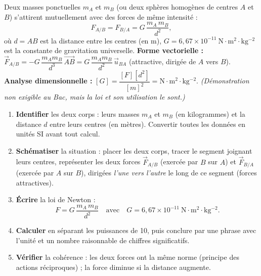 \documentclass[11pt]{article}
\begin{document}
\begin{propriete}
Deux masses ponctuelles $m_A$ et $m_B$ (ou deux sphères homogènes de centres $A$ et $B$) s'attirent mutuellement avec des forces de même intensité :
\[ F_{A/B} = F_{B/A} = G\,\dfrac{m_A\,m_B}{d^2}, \]
où $d = AB$ est la distance entre les centres (en \si{\metre}), $G = 6,67\times 10^{-11}\ \mathrm{N\cdot m^2\cdot kg^{-2}}$ est la constante de gravitation universelle.
\textbf{Forme vectorielle :} $\vec{F}_{A/B} = -G\,\dfrac{m_A m_B}{d^3}\,\vec{AB} = G\,\dfrac{m_A m_B}{d^2}\,\vec{u}_{BA}$ (attractive, dirigée de $A$ vers $B$).
\textbf{Analyse dimensionnelle :} $[G] = \dfrac{[F][d^2]}{[m]^2} = \mathrm{N\cdot m^2\cdot kg^{-2}}$. \emph{(Démonstration non exigible au Bac, mais la loi et son utilisation le sont.)}
\end{propriete}

\begin{methode}
\begin{enumerate}
\item \textbf{Identifier} les deux corps : leurs masses $m_A$ et $m_B$ (en kilogrammes) et la distance $d$ entre leurs centres (en mètres). Convertir toutes les données en unités SI avant tout calcul.
\item \textbf{Schématiser} la situation : placer les deux corps, tracer le segment joignant leurs centres, représenter les deux forces $\vec{F}_{A/B}$ (exercée par $B$ sur $A$) et $\vec{F}_{B/A}$ (exercée par $A$ sur $B$), dirigées \emph{l'une vers l'autre} le long de ce segment (forces attractives).
\item \textbf{Écrire} la loi de Newton :
\[ F = G\,\dfrac{m_A\, m_B}{d^2} \quad \text{avec} \quad G = 6{,}67\times 10^{-11}\ \mathrm{N\cdot m^2\cdot kg^{-2}}. \]
\item \textbf{Calculer} en séparant les puissances de 10, puis conclure par une phrase avec l'unité et un nombre raisonnable de chiffres significatifs.
\item \textbf{Vérifier} la cohérence : les deux forces ont la même norme (principe des actions réciproques) ; la force diminue si la distance augmente.
\end{enumerate}
\end{methode}
\end{document}

